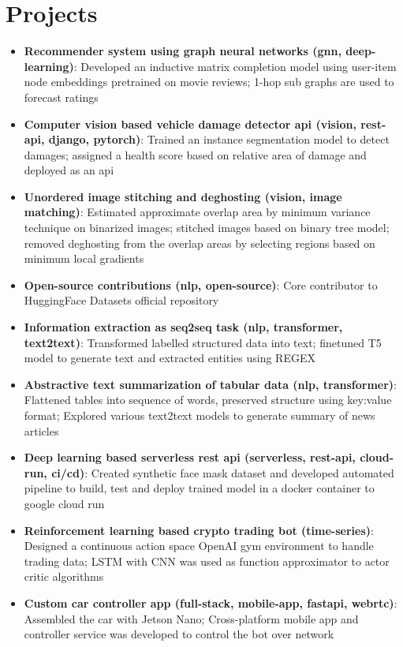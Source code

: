 \documentclass[a4paper,20pt]{article}
\newcommand{\resumeItem}[2]{
  \item\small{
    \textbf{#1}{: #2 \vspace{-2pt}}
  }
}
\newcommand{\resumeSubItem}[2]{\resumeItem{#1}{#2}\vspace{-3pt}}
\newcommand{\resumeSubHeadingListStart}{\begin{itemize}[leftmargin=*]}
\newcommand{\resumeSubHeadingListEnd}{\end{itemize}}
\begin{document}
\section{Projects}
\resumeSubHeadingListStart
\resumeSubItem{Recommender system using graph neural networks (gnn, deep-learning)}{Developed an inductive matrix completion model using user-item node embeddings pretrained on movie reviews; 1-hop sub graphs are used to forecast ratings}
\vspace{2pt}
\resumeSubItem{Computer vision based vehicle damage detector api (vision, rest-api, django, pytorch)}{Trained an instance segmentation model to detect damages; assigned a health score based on relative area of damage and deployed as an api}
\vspace{2pt}
\resumeSubItem{Unordered image stitching and deghosting (vision, image matching)}{Estimated approximate overlap area by minimum variance technique on binarized images; stitched images based on binary tree model; removed deghosting from the overlap areas by selecting regions based on minimum local gradients}
\vspace{2pt}
\resumeSubItem{Open-source contributions (nlp, open-source)}{Core contributor to HuggingFace Datasets official repository}
\vspace{2pt}
\resumeSubItem{Information extraction as seq2seq task (nlp, transformer, text2text)}{Transformed labelled structured data into text; finetuned T5 model to generate text and extracted entities using REGEX}
\vspace{2pt}
\resumeSubItem{Abstractive text summarization of tabular data (nlp, transformer)}{Flattened tables into sequence of words, preserved structure using key:value format; Explored various text2text models to generate summary of news articles}
\vspace{2pt}
\resumeSubItem{Deep learning based serverless rest api (serverless, rest-api, cloud-run, ci/cd)}{Created synthetic face mask dataset and developed automated pipeline to build, test and deploy trained model in a docker container to google cloud run}
\vspace{2pt}
\resumeSubItem{Reinforcement learning based crypto trading bot (time-series)}{Designed a continuous action space OpenAI gym environment to handle trading data; LSTM with CNN was used as function approximator to actor critic algorithms}
\vspace{2pt}
\resumeSubItem{Custom car controller app (full-stack, mobile-app, fastapi, webrtc)}{Assembled the car with Jetson Nano; Cross-platform mobile app and controller service was developed to control the bot over network}
\resumeSubHeadingListEnd
\vspace{-5pt}
\end{document}
